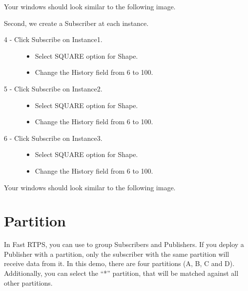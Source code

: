\documentclass[letterpaper,10pt,english]{sphinxmanual}
\begin{document}
Your windows should look similar to the following image.


Second, we create a Subscriber at each instance.
\begin{description}
\item[{4 - Click Subscribe on Instance1.}] \leavevmode\begin{itemize}
\item {} 
Select SQUARE option for Shape.

\item {} 
Change the History field from 6 to 100.

\end{itemize}

\item[{5 - Click Subscribe on Instance2.}] \leavevmode\begin{itemize}
\item {} 
Select SQUARE option for Shape.

\item {} 
Change the History field from 6 to 100.

\end{itemize}

\item[{6 - Click Subscribe on Instance3.}] \leavevmode\begin{itemize}
\item {} 
Select SQUARE option for Shape.

\item {} 
Change the History field from 6 to 100.

\end{itemize}

\end{description}

Your windows should look similar to the following image.



\chapter{Partition}
\label{\detokenize{partition:partition}}\label{\detokenize{partition::doc}}
In Fast RTPS, you can use  to group Subscribers and Publishers. If you deploy a Publisher with a partition, only the subscriber with the same partition will receive data from it. In this demo, there are four partitions (A, B, C and D). Additionally, you can select the “*” partition, that will be matched against all other partitions.
\end{document}
